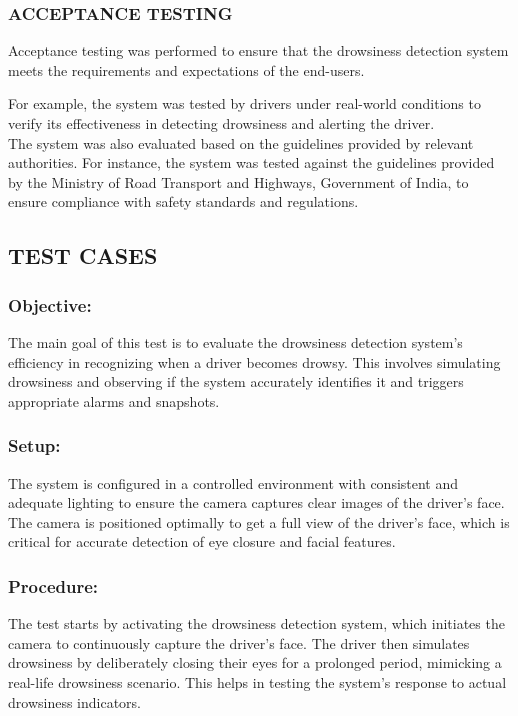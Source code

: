 \documentclass[12pt]{article}
\begin{document}
\subsubsection{ACCEPTANCE TESTING}
Acceptance testing was performed to ensure that the drowsiness detection system meets the requirements and expectations of the end-users.

For example, the system was tested by drivers under real-world conditions to verify its effectiveness in detecting drowsiness and alerting the driver.\\

The system was also evaluated based on the guidelines provided by relevant authorities. For instance, the system was tested against the guidelines provided by the Ministry of Road Transport and Highways, Government of India, to ensure compliance with safety standards and regulations.

\subsection{TEST CASES}

\subsubsection{Objective:}

The main goal of this test is to evaluate the drowsiness detection system’s efficiency in recognizing when a driver becomes drowsy. This involves simulating drowsiness and observing if the system accurately identifies it and triggers appropriate alarms and snapshots.

\subsubsection{ Setup:}

The system is configured in a controlled environment with consistent and adequate lighting to ensure the camera captures clear images of the driver's face. The camera is positioned optimally to get a full view of the driver’s face, which is critical for accurate detection of eye closure and facial features.

\subsubsection{Procedure: }

The test starts by activating the drowsiness detection system, which initiates the camera to continuously capture the driver’s face. The driver then simulates drowsiness by deliberately closing their eyes for a prolonged period, mimicking a real-life drowsiness scenario. This helps in testing the system's response to actual drowsiness indicators.
\end{document}
